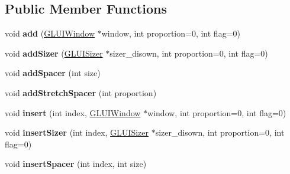 \subsection*{Public Member Functions}
\begin{DoxyCompactItemize}
\item 
\hypertarget{classCartWheel_1_1GL_1_1GLUISizer_a592b0eb7a9677e8ddb7c5b088169e708}{
void {\bfseries add} (\hyperlink{classCartWheel_1_1GL_1_1GLUIWindow}{GLUIWindow} $\ast$window, int proportion=0, int flag=0)}
\label{classCartWheel_1_1GL_1_1GLUISizer_a592b0eb7a9677e8ddb7c5b088169e708}

\item 
\hypertarget{classCartWheel_1_1GL_1_1GLUISizer_a9acad1d3bc47e16fb729aab61c4e0504}{
void {\bfseries addSizer} (\hyperlink{classCartWheel_1_1GL_1_1GLUISizer}{GLUISizer} $\ast$sizer\_\-disown, int proportion=0, int flag=0)}
\label{classCartWheel_1_1GL_1_1GLUISizer_a9acad1d3bc47e16fb729aab61c4e0504}

\item 
\hypertarget{classCartWheel_1_1GL_1_1GLUISizer_a8525cb2d4fd8e8749a5563caba787361}{
void {\bfseries addSpacer} (int size)}
\label{classCartWheel_1_1GL_1_1GLUISizer_a8525cb2d4fd8e8749a5563caba787361}

\item 
\hypertarget{classCartWheel_1_1GL_1_1GLUISizer_a13d833f8f712e50d09db73d75d1811c1}{
void {\bfseries addStretchSpacer} (int proportion)}
\label{classCartWheel_1_1GL_1_1GLUISizer_a13d833f8f712e50d09db73d75d1811c1}

\item 
\hypertarget{classCartWheel_1_1GL_1_1GLUISizer_a72c66120c831b4587db2712a3107d9df}{
void {\bfseries insert} (int index, \hyperlink{classCartWheel_1_1GL_1_1GLUIWindow}{GLUIWindow} $\ast$window, int proportion=0, int flag=0)}
\label{classCartWheel_1_1GL_1_1GLUISizer_a72c66120c831b4587db2712a3107d9df}

\item 
\hypertarget{classCartWheel_1_1GL_1_1GLUISizer_aefda3dc9282e883197b5030bf1c56eb8}{
void {\bfseries insertSizer} (int index, \hyperlink{classCartWheel_1_1GL_1_1GLUISizer}{GLUISizer} $\ast$sizer\_\-disown, int proportion=0, int flag=0)}
\label{classCartWheel_1_1GL_1_1GLUISizer_aefda3dc9282e883197b5030bf1c56eb8}

\item 
\hypertarget{classCartWheel_1_1GL_1_1GLUISizer_a666e7b680e14e346a3a564038bdf9610}{
void {\bfseries insertSpacer} (int index, int size)}
\label{classCartWheel_1_1GL_1_1GLUISizer_a666e7b680e14e346a3a564038bdf9610}


\end{DoxyCompactItemize}
